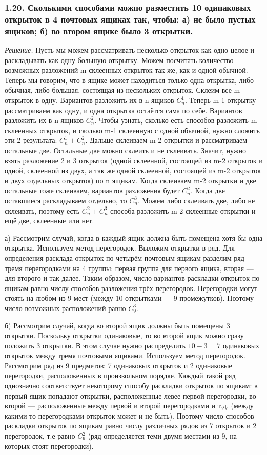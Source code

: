 \documentclass{book}
\begin{document}
\subsubsection*{1.20. Сколькими способами можно разместить 10 одинаковых открыток в 4 почтовых ящиках так, чтобы: а) не было пустых ящиков; б) во втором ящике было 3 открытки.}

\textit{Решение.} Пусть мы можем рассматривать несколько открыток как одно целое и раскладывать как одну большую открытку. Можем посчитать количество возможных разложений m склеенных открыток так же, как и одной обычной. Теперь мы говорим, что в ящике может находиться только одна открытка, либо обычная, либо большая, состоящая из нескольких открыток. Склеим все m открыток в одну. Вариантов разложить их в n ящиков $C_n^1$. Теперь m-1 открытку рассматриваем как одну, и одна открытка остаётся сама по себе. Вариантов разложить их в n ящиков $C_n^2$. Чтобы узнать, сколько есть способов разложить m склеенных открыток, и сколько m-1 склеенную с одной обычной, нужно сложить эти 2 результата: $C_n^1+C_n^2$. Дальше склеиваем m-2 открытки и рассматриваем остальные две. Остальные две можно склеить и не склеивать. Значит, нужно взять разложение 2 и 3 открыток (одной склеенной, состоящей из m-2 открыток и одной, склеенной из двух, а так же одной склеенной, состоящей из m-2 открыток и двух отдельных открыток) по n ящикам. Когда склеиваем m-2 открытки и две остальные тоже склеиваем, вариантов разложения будет $C_n^2$. Когда две оставшиеся раскладываем отдельно, то $C_n^3$. Можем либо склеивать две, либо не склеивать, поэтому есть $C_n^2+C_n^3$ способа разложить m-2 склеенные открытки и ещё две, склеенные или нет.

а) Рассмотрим случай, когда в каждый ящик должна быть помещена хотя бы одна открытка. Используем метод перегородок. Выложим открытки в ряд. Для определения расклада открыток по четырём почтовым ящикам разделим ряд тремя перегородками на 4 группы: первая группа для первого ящика, вторая --- для второго и так далее. Таким образом, число вариантов раскладки открыток по ящикам равно числу способов разложения трёх перегородок. Перегородки могут стоять на любом из 9 мест (между 10 открытками --- 9 промежутков). Поэтому число возможных расположений равно $C_9^3$.

б) Рассмотрим случай, когда во второй ящик должны быть помещены 3 открытки. Поскольку открытки одинаковые, то во второй ящик можно сразу положить 3 открытки. В этом случае нужно распределить $10-3=7$ одинаковых открыток между тремя почтовыми ящиками. Используем метод перегородок. Рассмотрим ряд из 9 предметов: 7 одинаковых открыток и 2 одинаковые перегородки, расположенных в произвольном порядке. Каждый такой ряд однозначно соответствует некоторому способу раскладки открыток по ящикам: в первый ящик попадают открытки, расположенные левее первой перегородки, во второй --- расположенные между первой и второй перегородками и т.д. (между какими-то перегородками открыток может и не быть). Поэтому число способов раскладки открыток по ящикам равно числу различных рядов из 7 открыток и 2 перегородок, т.е равно $C_9^2$ (ряд определяется теми двумя местами из 9, на которых стоят перегородки).
\end{document}
